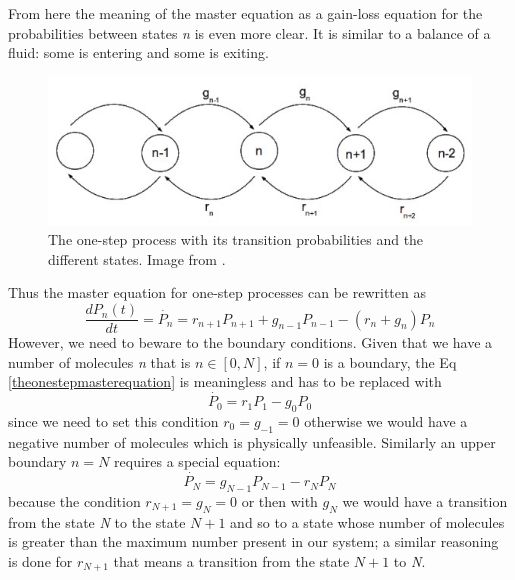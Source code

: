 \documentclass[12pt,a4paper]{report}
\begin{document}
From here the meaning of the master equation as a gain-loss equation for the probabilities between states \emph{n} is even more clear. It is similar to a balance of a fluid: some is entering and some is exiting.
\begin{figure}[ht]
\includegraphics[scale=0.90]{theonestep.jpg}
\caption{ The one-step process with its transition probabilities and the different states. Image from \cite{Ragazza}.}
\label{theonestep}
\end{figure}
\newline 
Thus the master equation for one-step processes can be rewritten as
\begin{equation}\label{theonestepmasterequation}
\frac{dP_{n}(t)}{dt} = \dot{P_{n}} = r_{n+1}P_{n+1} + g_{n-1}P_{n-1}-(r_{n}+g_{n})P_{n}
\end{equation}
However, we need to beware to the boundary conditions. Given that we have a number of molecules \emph{n} that is $n \in [0,N]$, if $n = 0$ is a boundary, the Eq \ref{theonestepmasterequation} is meaningless and has to be replaced with 
\begin{equation}
\dot{P_{0}} = r_{1}P_{1} - g_{0}P_{0}
\end{equation}
since we need to set this condition $r_{0} = g_{-1} = 0$ otherwise we would have a negative number of molecules which is physically unfeasible. Similarly an upper boundary $n = N$ requires a special equation:
\begin{equation}
\dot{P_{N}} = g_{N-1}P_{N-1} - r_{N}P_{N}
\end{equation}
because the condition $r_{N+1}=g_{N}=0$ or then with $g_{N}$ we would have a transition from the state \emph{N} to the state $N+1$ and so to a state whose number of molecules is greater than the maximum number present in our system; a similar reasoning is done for $r_{N+1}$ that means a transition from the state $N+1$ to \emph{N}.
\end{document}

